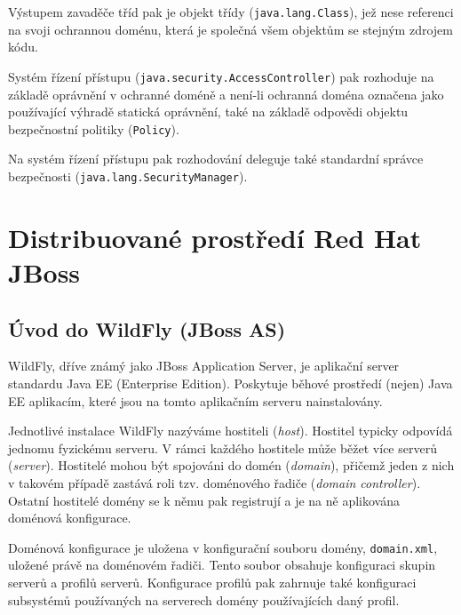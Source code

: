 Výstupem zavaděče tříd pak je objekt třídy ({\tt java.lang.Class}), jež nese referenci na svoji ochrannou doménu, která je společná všem objektům se stejným zdrojem kódu.

Systém řízení přístupu ({\tt java.security.AccessController}) pak rozhoduje na základě oprávnění v ochranné doméně a není-li ochranná doména označena jako používající výhradě statická oprávnění, také na základě odpovědi objektu bezpečnostní politiky ({\tt Policy}).

Na systém řízení přístupu pak rozhodování deleguje také standardní správce bezpečnosti ({\tt java.lang.SecurityManager}).


\chapter{Distribuované prostředí Red Hat JBoss} \label{jboss}

\section{Úvod do WildFly (JBoss AS)} \label{uvodWildFly}

WildFly, dříve známý jako JBoss Application Server, je aplikační server standardu Java EE (Enterprise Edition).
Poskytuje běhové prostředí (nejen) Java EE aplikacím, které jsou na tomto aplikačním serveru nainstalovány.
\cite{wildflyRename}

Jednotlivé instalace WildFly nazýváme hostiteli ({\it host}). Hostitel typicky odpovídá jednomu fyzickému serveru.
V rámci každého hostitele může běžet více serverů ({\it server}).
Hostitelé mohou být spojováni do domén ({\it domain}), přičemž jeden z nich v takovém případě zastává roli tzv. doménového řadiče ({\it domain controller}).
Ostatní hostitelé domény se k němu pak registrují a je na ně aplikována doménová konfigurace.
\cite{jbossDomainSetup}

Doménová konfigurace je uložena v konfigurační souboru domény, {\tt domain.xml}, uložené právě na doménovém řadiči.
Tento soubor obsahuje konfiguraci skupin serverů a profilů serverů.
Konfigurace profilů pak zahrnuje také konfiguraci subsystémů používaných na serverech domény používajících daný profil.
\cite{jbossDomainSetup}

